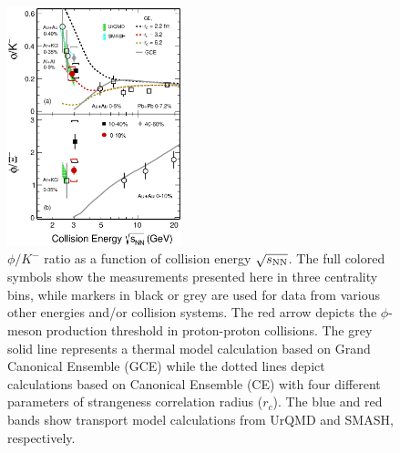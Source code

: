 \documentclass[%
 reprint,	
showpacs,
 amsmath,amssymb,
 aps,
 prc,
]{revtex4-1}
\begin{document}
\begin{figure}
\centering
\includegraphics[width=0.45\textwidth]{fig/fig4_phi_over_kminus_zoomin.eps}
  \caption{ $\phi/K^-$ ratio as a function of collision energy $\sqrt{s_{\rm NN}}$. The full colored symbols show the measurements presented here in three centrality bins, while markers in black or grey are used for data from various other energies and/or collision systems. The red arrow depicts the $\phi$-meson production threshold in proton-proton collisions. The grey solid line represents a thermal model calculation based on Grand Canonical Ensemble (GCE) while the dotted lines depict calculations based on Canonical Ensemble (CE) with four different parameters of strangeness correlation radius ($r_c$). The blue and red bands show transport model calculations from UrQMD and SMASH, respectively.}
\label{fig:phi2Kratio} 
\end{figure}
\end{document}
